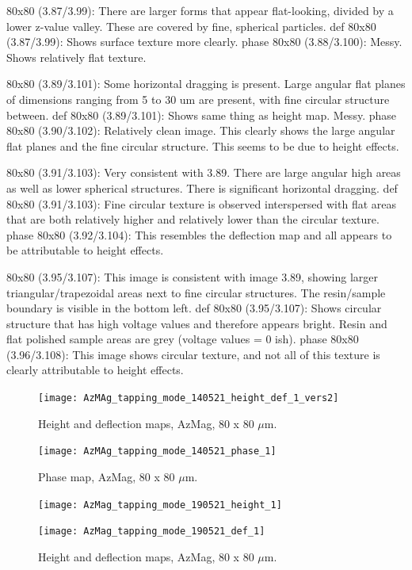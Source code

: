 80x80 (3.87/3.99): There are larger forms that appear flat-looking, divided by a lower z-value valley. These are covered by fine, spherical particles.
def 80x80 (3.87/3.99): Shows surface texture more clearly.
phase 80x80 (3.88/3.100): Messy. Shows relatively flat texture.


80x80 (3.89/3.101): Some horizontal dragging is present. Large angular flat planes of dimensions ranging from 5 to 30 um are present, with fine circular structure between.
def 80x80 (3.89/3.101): Shows same thing as height map. Messy.
phase 80x80 (3.90/3.102): Relatively clean image. This clearly shows the large angular flat planes and the fine circular structure. This seems to be due to height effects.

80x80 (3.91/3.103): Very consistent with 3.89. There are large angular high areas as well as lower spherical structures. There is significant horizontal dragging.
def 80x80 (3.91/3.103): Fine circular texture is observed interspersed with flat areas that are both relatively higher and relatively lower than the circular texture. 
phase 80x80 (3.92/3.104): This resembles the deflection map and all appears to be attributable to height effects.


80x80 (3.95/3.107): This image is consistent with image 3.89, showing larger triangular/trapezoidal areas next to fine circular structures. The resin/sample boundary is visible in the bottom left.
def 80x80 (3.95/3.107): Shows circular structure that has high voltage values and therefore appears bright. Resin and flat polished sample areas are grey (voltage values = 0 ish). 
phase 80x80 (3.96/3.108): This image shows circular texture, and not all of this texture is clearly attributable to height effects.



\begin{figure}[H]
\centering
  \texttt{[image: AzMAg\_tapping\_mode\_140521\_height\_def\_1\_vers2]}
\caption[Height and deflection maps, AzMag]{Height and deflection maps, AzMag, 80 x 80 $\mu$m.}
\label{fig:afm_azmag_height_def_1}
\end{figure}

\begin{figure}[H]
\centering
  \texttt{[image: AzMAg\_tapping\_mode\_140521\_phase\_1]}
\caption[Phase map, AzMag]{Phase map, AzMag, 80 x 80 $\mu$m.}
\label{fig:afm_azmag_phase_1}
\end{figure}


\begin{figure}[H]
\centering
\begin{minipage}{.45\textwidth}
  \centering
  \texttt{[image: AzMag\_tapping\_mode\_190521\_height\_1]}
\end{minipage}
\begin{minipage}{.45\textwidth}
  \centering
  \texttt{[image: AzMag\_tapping\_mode\_190521\_def\_1]}
\end{minipage}
\caption[Height and deflection maps, AzMag]{Height and deflection maps, AzMag, 80 x 80 $\mu$m.}
\label{fig:afm_azmag_height_def_2}
\end{figure}

